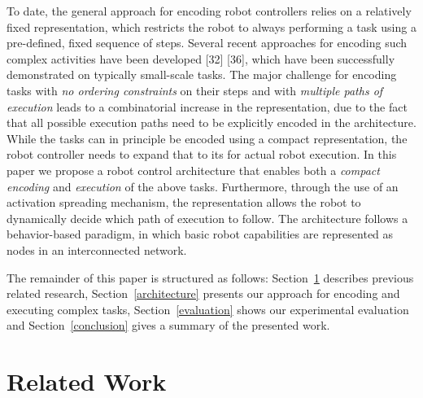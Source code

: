 \documentclass[letterpaper, 10 pt, conference]{ieeeconf}  %
\begin{document}
To date, the general approach for encoding robot controllers relies on a relatively fixed representation, which restricts the robot to always performing a task using a pre-defined, fixed sequence of steps. Several recent approaches for encoding such complex activities have been developed [32] [36], which have been successfully demonstrated on typically small-scale tasks. The major challenge for encoding tasks with {\it no ordering constraints} on their steps and with {\it multiple paths of execution} leads to a combinatorial increase in the representation, due to the fact that all possible execution paths need to be explicitly encoded in the architecture. While the tasks can in principle be encoded using a compact representation, the robot controller needs to expand that to its for actual robot execution. In this paper we propose a robot control architecture that enables both a {\it compact encoding} and {\it execution} of the above tasks. Furthermore, through the use of an activation spreading mechanism, the representation allows the robot to dynamically decide which path of execution to follow. The architecture follows a behavior-based paradigm, in which basic robot capabilities are represented as nodes in an interconnected network. 

The remainder of this paper is structured as follows: Section~\ref{relatedWork} describes previous related research, Section~\ref{architecture} presents our approach for encoding and executing complex tasks, Section~\ref{evaluation} shows our experimental evaluation and Section~\ref{conclusion} gives a summary of the presented work.

\section{Related Work}
\label{relatedWork}
\end{document}
